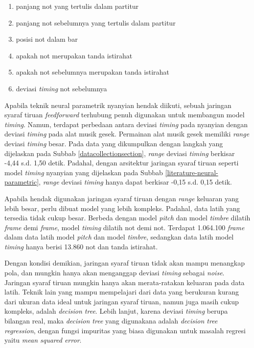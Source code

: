 \begin{enumerate}
    \item panjang not yang tertulis dalam partitur
    \item panjang not sebelumnya yang tertulis dalam partitur
    \item posisi not dalam bar
    \item apakah not merupakan tanda istirahat
    \item apakah not sebelumnya merupakan tanda istirahat
    \item deviasi \textit{timing} not sebelumnya
\end{enumerate}

Apabila teknik neural parametrik nyanyian hendak diikuti, sebuah jaringan syaraf tiruan \textit{feedforward} terhubung penuh digunakan untuk membangun model \textit{timing}. Namun, terdapat perbedaan antara deviasi \textit{timing} pada nyanyian dengan deviasi \textit{timing} pada alat musik gesek. Permainan alat musik gesek memiliki \textit{range} deviasi \textit{timing} besar. Pada data yang dikumpulkan dengan langkah yang dijelaskan pada Subbab \ref{datacollectionsection}, \textit{range} deviasi \textit{timing} berkisar -4,44 s.d. 1,50 detik. Padahal, dengan arsitektur jaringan syaraf tiruan seperti model \textit{timing} nyanyian yang dijelaskan pada Subbab \ref{literature-neural-parametric}, \textit{range} deviasi \textit{timing} hanya dapat berkisar -0,15 s.d. 0,15 detik.

Apabila hendak digunakan jaringan syaraf tiruan dengan \textit{range} keluaran yang lebih besar, perlu dibuat model yang lebih kompleks. Padahal, data latih yang tersedia tidak cukup besar. Berbeda dengan model \textit{pitch} dan model \textit{timbre} dilatih \textit{frame} demi \textit{frame}, model \textit{timing} dilatih not demi not. Terdapat  1.064.100 \textit{frame} dalam data latih model \textit{pitch} dan model \textit{timbre}, sedangkan data latih model \textit{timing} hanya berisi 13.860 not dan tanda istirahat.

Dengan kondisi demikian, jaringan syaraf tiruan tidak akan mampu menangkap pola, dan mungkin hanya akan menganggap deviasi \textit{timing} sebagai \textit{noise}. Jaringan syaraf tiruan mungkin hanya akan merata-ratakan keluaran pada data latih. Teknik lain yang mampu mempelajari dari data yang berukuran kurang dari ukuran data ideal untuk jaringan syaraf tiruan, namun juga masih cukup kompleks, adalah \textit{decision tree}. Lebih lanjut, karena deviasi \textit{timing} berupa bilangan real, maka \textit{decision tree} yang digunakana adalah \textit{decision tree regression}, dengan fungsi impuritas yang biasa digunakan untuk masalah regresi yaitu \textit{mean squared error}.

